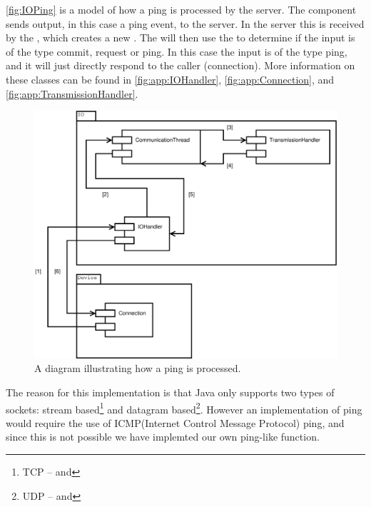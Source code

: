 \autoref{fig:IOPing} is a model of how a ping is processed by the server. The  component sends output, in this case a ping event, to the server. In the server this is received by the , which creates a new \newline {}.
The  will then use the \newline {} to determine if the input is of the type commit, request or ping.
In this case the input is of the type ping, and it will just directly respond to the caller (connection). 
More information on these classes can be found in \autoref{fig:app:IOHandler}, \autoref{fig:app:Connection}, and \autoref{fig:app:TransmissionHandler}.
\begin{figure}[htbp]
	\centering
          \includegraphics[scale=0.40]{images/ping}
	\caption{A diagram illustrating how a ping is processed.} 
	\label{fig:IOPing}
\end{figure}

The reason for this implementation is that Java only supports two types of sockets: stream based\footnote{TCP --  and } and datagram based\footnote{UDP --  and }\cite{javaNET}.
However an implementation of ping would require the use of ICMP(Internet Control Message Protocol) ping, and since this is not possible we have implemted our own ping-like function\cite{ICMP}.


